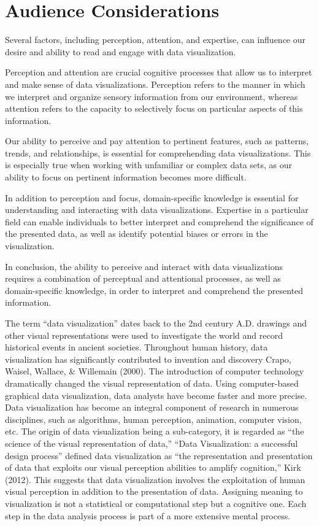 \documentclass[print]{nuthesis}
\begin{document}
\hypertarget{audience-considerations}{%
\section{Audience Considerations}\label{audience-considerations}}

Several factors, including perception, attention, and expertise, can influence our desire and ability to read and engage with data visualization.

Perception and attention are crucial cognitive processes that allow us to interpret and make sense of data visualizations.
Perception refers to the manner in which we interpret and organize sensory information from our environment, whereas attention refers to the capacity to selectively focus on particular aspects of this information.

Our ability to perceive and pay attention to pertinent features, such as patterns, trends, and relationships, is essential for comprehending data visualizations.
This is especially true when working with unfamiliar or complex data sets, as our ability to focus on pertinent information becomes more difficult.

In addition to perception and focus, domain-specific knowledge is essential for understanding and interacting with data visualizations.
Expertise in a particular field can enable individuals to better interpret and comprehend the significance of the presented data, as well as identify potential biases or errors in the visualization.

In conclusion, the ability to perceive and interact with data visualizations requires a combination of perceptual and attentional processes, as well as domain-specific knowledge, in order to interpret and comprehend the presented information.

The term ``data visualization'' dates back to the 2nd century A.D. drawings and other visual representations were used to investigate the world and record historical events in ancient societies.
Throughout human history, data visualization has significantly contributed to invention and discovery Crapo, Waisel, Wallace, \& Willemain (2000).
The introduction of computer technology dramatically changed the visual representation of data.
Using computer-based graphical data visualization, data analysts have become faster and more precise.
Data visualization has become an integral component of research in numerous disciplines, such as algorithms, human perception, animation, computer vision, etc.
The origin of data visualization being a sub-category, it is regarded as ``the science of the visual representation of data,''
``Data Visualization: a successful design process'' defined data visualization as ``the representation and presentation of data that exploits our visual perception abilities to amplify cognition,'' Kirk (2012).
This suggests that data visualization involves the exploitation of human visual perception in addition to the presentation of data.
Assigning meaning to visualization is not a statistical or computational step but a cognitive one.
Each step in the data analysis process is part of a more extensive mental process.
\end{document}

